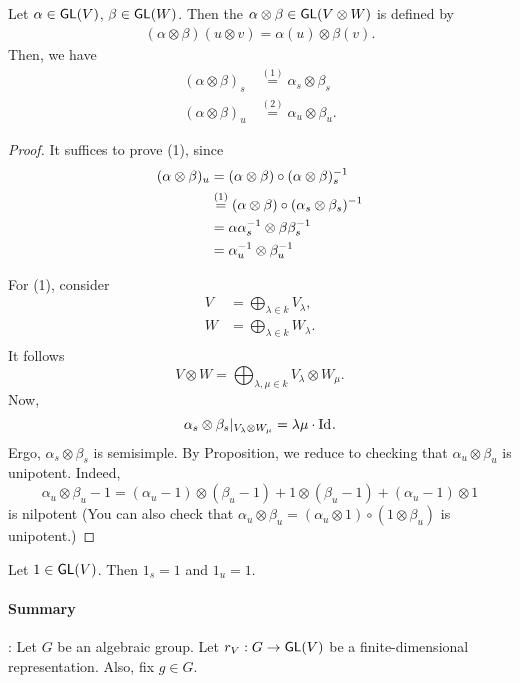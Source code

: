 \begin{lemma}
Let $\alpha \in \textsf{GL}(V)$, $\beta \in \textsf{GL}(W)$. Then the  $\alpha \otimes \beta \in \textsf{GL}(V\otimes W)$ is defined by
\begin{align*}
(\alpha\otimes \beta)(u\otimes v) = \alpha(u) \otimes \beta(v).
\end{align*}
Then, we have
\begin{align*}
(\alpha \otimes \beta)_s &\overset{(1)}{=} \alpha_s \otimes \beta_s\\
(\alpha \otimes \beta)_u &\overset{(2)}{=}  \alpha_u \otimes \beta_u.
\end{align*}
\end{lemma}
\begin{proof}
It suffices to prove (1), since
\begin{align*}
(\alpha \otimes \beta)_u &=
(\alpha \otimes \beta) \circ (\alpha \otimes \beta)_s^{-1}\\
&\overset{(1)}{=} (\alpha \otimes \beta) \circ (\alpha_s \otimes \beta_s)^{-1}\\
&= \alpha\alpha_s^{-1} \otimes \beta \beta_s^{-1}\\
&= \alpha_u^{-1} \otimes \beta_u^{-1}
\end{align*}

For (1), consider
\begin{align*}
V &= \bigoplus_{\lambda \in k} V_\lambda,\\
W &= \bigoplus_{\lambda \in k} W_\lambda.\\
\end{align*}
It follows
\[ V\otimes W = \bigoplus_{\lambda, \mu \in k} V_\lambda \otimes W_\mu. \]
Now,
\[ \alpha_s \otimes \beta_s|_{V_\lambda \otimes W_\mu} = \lambda\mu \cdot \text{Id}_{}. \]
Ergo, $\alpha_s \otimes \beta_s$ is semisimple. By Proposition, we reduce to checking that $\alpha_u \otimes \beta_u$ is unipotent. Indeed,
\[ \alpha_u \otimes \beta_u - 1 = (\alpha_u -1) \otimes  (\beta_u - 1)  + 1 \otimes (\beta_u - 1) + (\alpha_u - 1) \otimes 1 \]
is nilpotent (You can also check that $\alpha_u \otimes \beta_u = (\alpha_u \otimes 1) \circ (1 \otimes \beta_u)$ is unipotent.)
\end{proof}

\begin{example}
	Let $1 \in \textsf{GL}(V)$. Then $1_s = 1$ and $1_u = 1$.
\end{example}

\paragraph{Summary}: Let $G$ be an algebraic group. Let $r_V : G \overset{}{\rightarrow} \textsf{GL}(V)$ be a finite-dimensional representation. Also, fix $g \in G$.

